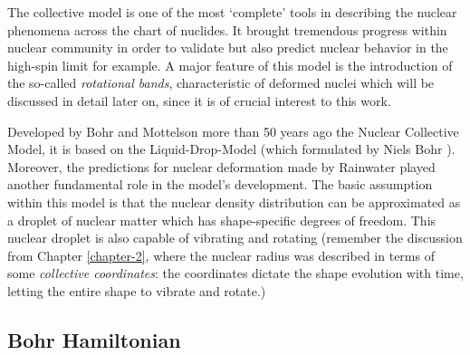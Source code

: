 The collective model is one of the most `complete' tools in describing the nuclear phenomena across the chart of nuclides. It brought tremendous progress within nuclear community in order to validate but also predict nuclear behavior in the high-spin limit for example. A major feature of this model is the introduction of the so-called \emph{rotational bands}, characteristic of deformed nuclei which will be discussed in detail later on, since it is of crucial interest to this work.

Developed by Bohr and Mottelson \cite{bohr1953collective,bohr1998nuclear} more than 50 years ago the Nuclear Collective Model, it is based on the Liquid-Drop-Model (which formulated by Niels Bohr \cite{meitner1939disintegration,bohr1939mechanism,myers1974nuclear}). Moreover, the predictions for nuclear deformation made by Rainwater \cite{rainwater1950nuclear} played another fundamental role in the model's development. The basic assumption within this model is that the nuclear density distribution can be approximated as a droplet of nuclear matter which has shape-specific degrees of freedom. This nuclear droplet is also capable of vibrating and rotating (remember the discussion from Chapter \ref{chapter-2}, where the nuclear radius was described in terms of some \emph{collective coordinates}: the coordinates dictate the shape evolution with time, letting the entire shape to vibrate and rotate.)

\subsection{Bohr Hamiltonian}

